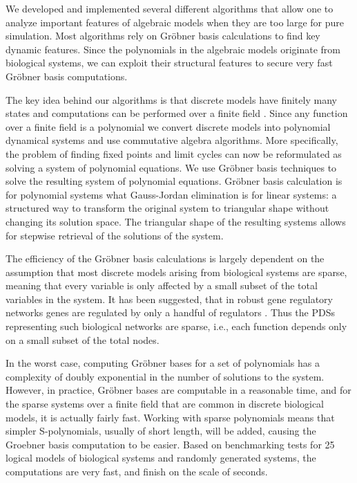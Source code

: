 \documentclass[11pt]{amsart}
\begin{document}
We developed and implemented several different algorithms that allow one to analyze
important features of algebraic models when they are too large for pure simulation.
Most algorithms rely on Gr\"obner basis calculations to find key dynamic
features.
Since the polynomials in the algebraic
models originate from biological systems, we can exploit their structural
features to secure very fast Gr\"obner basis computations.
 
The key idea behind our algorithms is that discrete models have finitely many states and computations
can be performed over a finite field \cite{Alan:Bioinf2010,
Hinkelmann:2010}. Since any function over a finite field is a polynomial
\cite{Lidl:1997} we convert discrete models into polynomial dynamical systems
and use commutative algebra algorithms. More specifically, the problem of finding fixed points and limit cycles
can now be reformulated as solving a system of polynomial equations. We use Gr\"{o}bner basis techniques to solve the
resulting system of polynomial equations. Gr\"obner basis calculation is for polynomial systems what
Gauss-Jordan elimination is for linear systems: a structured way to transform
the original system to triangular shape without changing its solution space.
The triangular shape of the resulting systems allows for stepwise retrieval of the solutions of the system.
 
The efficiency of the Gr\"obner basis calculations is largely dependent on the
assumption that most discrete models arising from biological systems are
sparse, meaning that every variable is only affected by a small subset of the
total variables in the system. It has been suggested, that in robust gene
regulatory networks genes are regulated by only a handful of regulators
\cite{Leclerc:2008}. Thus the PDSs representing such biological networks are
sparse, i.e., each function depends only on a small subset of the total nodes.
 
In the worst case, computing Gr\"obner bases for a set of polynomials has a
complexity of doubly exponential in the number of solutions to the system.
However, in practice, Gr\"{o}bner bases are computable in a reasonable time, and
for the sparse systems over a finite field that are common in discrete
biological models, it is actually fairly fast.
Working with sparse polynomials means that simpler
S-polynomials, usually of short length, will be added, causing the Groebner
basis computation to be easier.
Based on benchmarking tests for
25 logical models of biological systems \cite{GINsim}
and randomly generated systems,
the computations are very fast, and finish on the scale of
seconds.
 
\end{document}
